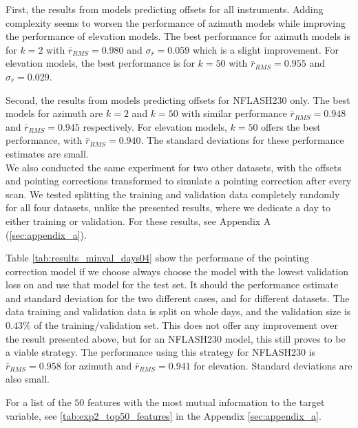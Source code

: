 First, the results from models predicting offsets for all instruments.
Adding complexity seems to worsen the performance of azimuth models while improving the performance of elevation models.
The best performance for azimuth models is for $k=2$ with $\bar{r}_{RMS}=0.980$ and $\sigma_{\bar{r}} = 0.059$ which is a slight improvement. 
For elevation models, the best performance is for $k=50$ with $\bar{r}_{RMS}=0.955$ and $\sigma_{\bar{r}} = 0.029$.

Second, the results from models predicting offsets for NFLASH230 only.
The best models for azimuth are $k=2$ and $k=50$ with similar performance $\bar{r}_{RMS}=0.948$ and $\bar{r}_{RMS}=0.945$ respectively.
For elevation models, $k=50$ offers the best performance, with $\bar{r}_{RMS}=0.940$.
The standard deviations for these performance estimates are small.\\


We also conducted the same experiment for two other datasets, with the offsets and pointing corrections transformed to simulate a pointing correction after every scan.
We tested splitting the training and validation data completely randomly for all four datasets, unlike the presented results, where we dedicate a day to either training or validation.
For these results, see Appendix A (\ref{sec:appendix_a}).



Table \ref{tab:results_minval_days04} show the performane of the pointing correction model if we choose always choose the model with the lowest validation
loss on and use that model for the test set. It should the performance estimate and standard deviation for the two different cases, and for different datasets.
The data training and validation data is split on whole days, and the validation size is $0.43\%$ of the training/validation set.
This does not offer any improvement over the result presented above, but for an NFLASH230 model, this still proves to be a viable strategy.
The performance using this strategy for NFLASH230 is $\bar{r}_{RMS}=0.958$ for azimuth and $\bar{r}_{RMS}=0.941$ for elevation. 
Standard deviations are also small.

For a list of the $50$ features with the most mutual information to the target variable, see \ref{tab:exp2_top50_features} in the Appendix \ref{sec:appendix_a}.





